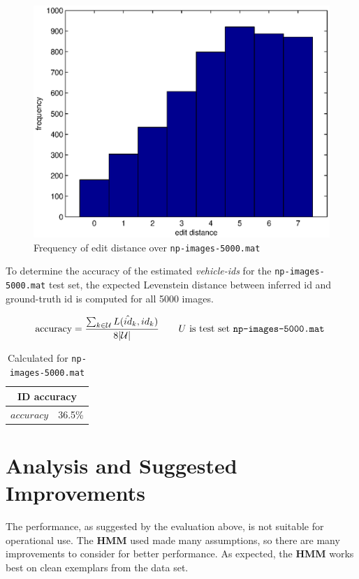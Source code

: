 \documentclass[a4paper,12pt]{article}
\begin{document}
\begin{figure}[ht]
\begin{center}
\includegraphics[width=0.75\linewidth]{matlab/hamming.eps}
\caption{ Frequency of edit distance over \texttt{np-images-5000.mat}  } 
\label{fig:editdistance}
\end{center}
\end{figure}

To determine the accuracy of the estimated \emph{vehicle-ids} for the
\texttt{np-images-5000.mat} test set, the expected Levenstein distance
between inferred id and ground-truth id is computed for all 5000
images.

\[ \text{accuracy} = \frac{\sum_{k \in \mathcal{U}}
  L(\hat{id}_k,id_k)}{8|\mathcal{U}|} \qquad U \text{ is test set
  \texttt{np-images-5000.mat} }  \]

\begin{table}[ht]
\begin{center}
\begin{tabular}{|l|l|}
  \hline
  \multicolumn{2}{|c|}{ID accuracy} \\
  \hline
  $accuracy$ & 36.5\% \\
  \hline
\end{tabular}
\caption{Calculated for \texttt{np-images-5000.mat}}
\end{center}
\end{table}

\section{Analysis and Suggested Improvements}
The performance, as suggested by the evaluation above, is not suitable
for operational use. The \textbf{HMM} used made many assumptions, so
there are many improvements to consider for better performance. As
expected, the \textbf{HMM} works best on clean exemplars from the data
set.
\end{document}
